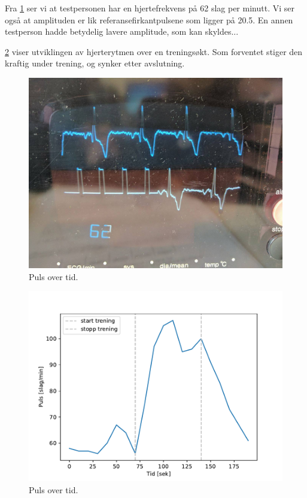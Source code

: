 \documentclass[11pt,norsk]{article}
\begin{document}
Fra \ref{fig:picture3} ser vi at testpersonen har en hjertefrekvens på 62 slag per minutt. Vi ser også at amplituden er lik referansefirkantpulsene som ligger på 20.5. En annen testperson hadde betydelig lavere amplitude, som kan skyldes...

\ref{fig:heartrate} viser utviklingen av hjerterytmen over en treningsøkt. Som forventet stiger den kraftig under trening, og synker etter avslutning.

\begin{figure}[H]
\includegraphics[width = \textwidth]{fig/picture3.jpg}
\caption{Puls over tid.}
\label{fig:picture3}
\end{figure}

\begin{figure}[H]
\includegraphics[width = \textwidth]{fig/heartrate.pdf}
\caption{Puls over tid.}
\label{fig:heartrate}
\end{figure}
\end{document}
